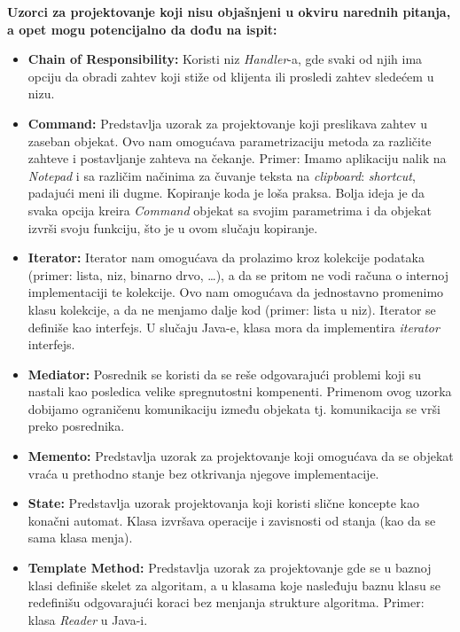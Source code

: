 \documentclass[a4paper]{article}
\begin{document}
  \textbf{Uzorci za projektovanje koji nisu objašnjeni u okviru narednih pitanja, a opet mogu potencijalno da
          dođu na ispit:}
  \begin{itemize}
    \item \textbf{Chain of Responsibility:} Koristi niz \textit{Handler}-a, gde svaki od njih
          ima opciju da obradi zahtev koji stiže od klijenta ili prosledi zahtev sledećem u nizu.
    \item \textbf{Command:} Predstavlja uzorak za projektovanje koji preslikava zahtev u zaseban 
          objekat. Ovo nam omogućava parametrizaciju metoda za različite zahteve i postavljanje
          zahteva na čekanje. Primer: Imamo aplikaciju nalik na \textit{Notepad} i sa različim
          načinima za čuvanje teksta na \textit{clipboard}: \textit{shortcut}, padajući meni
          ili dugme. Kopiranje koda je loša praksa. Bolja ideja je da svaka opcija kreira
          \textit{Command} objekat sa svojim parametrima i da objekat izvrši svoju funkciju,
          što je u ovom slučaju kopiranje.
    \item \textbf{Iterator:} Iterator nam omogućava da prolazimo kroz kolekcije podataka (primer:
          lista, niz, binarno drvo, \dots), a da se pritom ne vodi računa o internoj implementaciji
          te kolekcije. Ovo nam omogućava da jednostavno promenimo klasu kolekcije, a da ne menjamo
          dalje kod (primer: lista u niz). Iterator se definiše kao interfejs. U slučaju Java-e,
          klasa mora da implementira \textit{iterator} interfejs.
    \item \textbf{Mediator:} Posrednik se koristi da se reše odgovarajući problemi koji su nastali
          kao posledica velike spregnutostni kompenenti. Primenom ovog uzorka dobijamo ograničenu
          komunikaciju između objekata tj. komunikacija se vrši preko posrednika.
    \item \textbf{Memento:} Predstavlja uzorak za projektovanje koji omogućava da se objekat vraća
          u prethodno stanje bez otkrivanja njegove implementacije.
    \item \textbf{State:} Predstavlja uzorak projektovanja koji koristi slične koncepte kao konačni automat. Klasa
          izvršava operacije i zavisnosti od stanja (kao da se sama klasa menja). 
    \item \textbf{Template Method:} Predstavlja uzorak za projektovanje gde se u baznoj klasi
          definiše skelet za algoritam, a u klasama koje nasleđuju baznu klasu se redefinišu
          odgovarajući koraci bez menjanja strukture algoritma. Primer: klasa \textit{Reader}
          u Java-i.
  \end{itemize}
\end{document}
